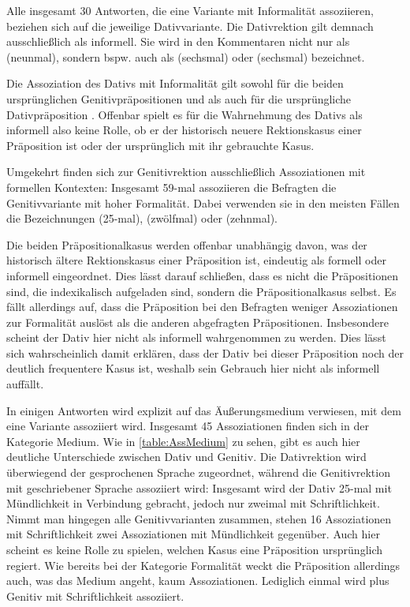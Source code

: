 Alle insgesamt 30 Antworten, die eine Variante mit Informalität assoziieren, beziehen sich auf die jeweilige Dativvariante. 
Die Dativrektion gilt demnach ausschließlich als informell. 
Sie wird in den Kommentaren nicht nur als  (neunmal), sondern bspw. auch als  (sechsmal) oder  (sechsmal) bezeichnet. 

\begin{sloppypar}
Die Assoziation des Dativs mit Informalität gilt sowohl für die beiden ursprünglichen Genitivpräpositionen \wegen{} und \waehrend{} als auch für die ursprüngliche Dativpräposition \dank{}. 
Offenbar spielt es für die Wahrnehmung des Dativs als informell also keine Rolle, ob er der historisch neuere Rektionskasus einer Präposition ist oder der ursprünglich mit ihr gebrauchte Kasus. 
\end{sloppypar}

Umgekehrt finden sich zur Genitivrektion ausschließlich Assoziationen mit formellen Kontexten:
Insgesamt 59-mal assoziieren die Befragten die Genitivvariante mit hoher Formalität. 
Dabei verwenden sie in den meisten Fällen die Bezeichnungen  (25-mal),  (zwölfmal) oder  (zehnmal). 

Die beiden Präpositionalkasus werden offenbar unabhängig davon, was der historisch ältere Rektionskasus einer Präposition ist, eindeutig als formell oder informell eingeordnet. 
Dies lässt darauf schließen, dass es nicht die Präpositionen sind, die indexikalisch aufgeladen sind, sondern  die Präpositionalkasus selbst. 
Es fällt allerdings auf, dass die Präposition \gegenueber{} bei den Befragten weniger Assoziationen zur Formalität auslöst als die anderen abgefragten Präpositionen. 
Insbesondere scheint der Dativ hier nicht als informell wahrgenommen zu werden. 
Dies lässt sich wahrscheinlich damit erklären, dass der Dativ bei dieser Präposition noch der deutlich frequentere Kasus ist, weshalb sein Gebrauch hier nicht als informell auffällt. 

In einigen Antworten wird explizit auf das Äußerungsmedium verwiesen, mit dem eine Variante assoziiert wird.  
Insgesamt 45 Assoziationen finden sich in der Kategorie \glqq Medium\grqq. 
Wie in \autoref{table:AssMedium} zu sehen, gibt es auch hier deutliche Unterschiede zwischen Dativ und Genitiv. 
Die Dativrektion wird überwiegend der gesprochenen Sprache zugeordnet, während die Genitivrektion mit geschriebener Sprache assoziiert wird: 
Insgesamt wird der Dativ 25-mal mit Mündlichkeit in Verbindung gebracht, jedoch nur zweimal mit Schriftlichkeit. 
Nimmt man hingegen alle Genitivvarianten zusammen, stehen 16 Assoziationen mit Schriftlichkeit zwei Assoziationen mit Mündlichkeit gegenüber. 
Auch hier scheint es keine Rolle zu spielen, welchen Kasus eine Präposition ursprünglich regiert. 
Wie bereits bei der Kategorie \glqq Formalität\grqq{} weckt die Präposition \gegenueber{} allerdings auch, was das Medium angeht, kaum Assoziationen. 
Lediglich einmal wird \gegenueber{} plus Genitiv mit Schriftlichkeit assoziiert.  

